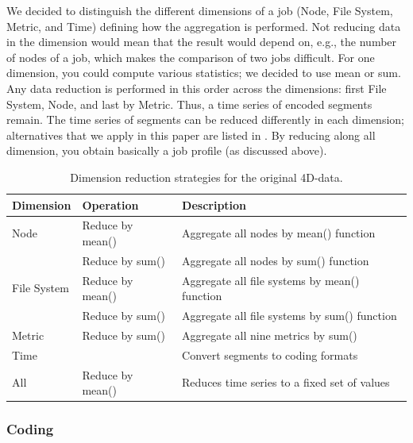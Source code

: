 \documentclass{jhps}
\begin{document}
We decided to distinguish the different dimensions of a job (Node, File System, Metric, and Time) defining how the aggregation is performed.
Not reducing data in the dimension would mean that the result would depend on, e.g., the number of nodes of a job, which makes the comparison of two jobs difficult.
For one dimension, you could compute various statistics; we decided to use mean or sum.
Any data reduction is performed in this order across the dimensions: first File System, Node, and last by Metric.
Thus, a time series of encoded segments remain.
The time series of segments can be reduced differently in each dimension; alternatives that we apply in this paper are listed in .
By reducing along all dimension, you obtain basically a job profile (as discussed above).

\begin{table}
	\centering
	\begin{tabularx}{\textwidth}{llX}
		Dimension       & Operation                                    &  Description                                   \\
		\midrule
		Node            & Reduce by mean()                             &  Aggregate all nodes by mean() function        \\
		                & Reduce by sum()                              &  Aggregate all nodes by sum() function         \\
		File System     & Reduce by mean()                             &  Aggregate all file systems by mean() function \\
		                &
		Reduce by sum() & Aggregate all file systems by sum() function \\
		Metric          & Reduce by sum()                              &  Aggregate all nine metrics by sum()           \\
		Time            &                                              &  Convert segments to coding formats            \\
		All             & Reduce by mean()                             &  Reduces time series to a fixed set of values  \\
	\end{tabularx}
	\caption{Dimension reduction strategies for the original 4D-data.}
	\label{tab:reduction_techniques}
\end{table}

\subsubsection{Coding}
\end{document}
